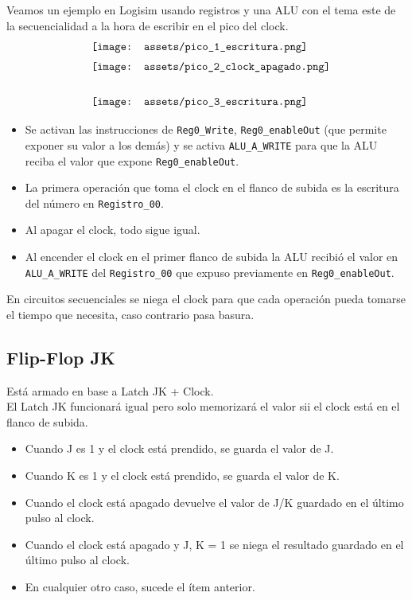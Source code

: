 \documentclass[10pt,a4paper]{article}
\begin{document}
Veamos un ejemplo en Logisim usando registros y una ALU con el tema este de la secuencialidad a la hora de escribir en el pico del clock. \\
\[\begin{minipage}[b]{0.6\textwidth}
    \texttt{[image: assets/pico\_1\_escritura.png]}
    \label{fig:pico_1_escritura}
\end{minipage}\]
\[\begin{minipage}[b]{0.6\textwidth}
    \texttt{[image: assets/pico\_2\_clock\_apagado.png]}
    \label{fig:pico_2_clock_apagado}
\end{minipage}\]
\[\begin{minipage}[b]{0.6\textwidth}
    \texttt{[image: assets/pico\_3\_escritura.png]}
    \label{fig:pico_3_escritura}
\end{minipage}\]
\begin{itemize}
    \item Se activan las instrucciones de \texttt{Reg0\_Write}, \texttt{Reg0\_enableOut} (que permite exponer su valor a los demás) y se activa \texttt{ALU\_A\_WRITE} para que la ALU reciba el valor que expone \texttt{Reg0\_enableOut}.
    \item La primera operación que toma el clock en el flanco de subida es la escritura del número en \texttt{Registro\_00}.
    \item Al apagar el clock, todo sigue igual.
    \item Al encender el clock en el primer flanco de subida la ALU recibió el valor en \texttt{ALU\_A\_WRITE} del \texttt{Registro\_00} que expuso previamente en \texttt{Reg0\_enableOut}.
\end{itemize}
En circuitos secuenciales se niega el clock para que cada operación pueda tomarse el tiempo que necesita, caso contrario pasa basura.

\subsection*{Flip-Flop JK}
Está armado en base a Latch JK + Clock. \\
El Latch JK funcionará igual pero solo memorizará el valor sii el clock está en el flanco de subida.
\begin{itemize}
    \item Cuando J es 1 y el clock está prendido, se guarda el valor de J.
    \item Cuando K es 1 y el clock está prendido, se guarda el valor de K.
    \item Cuando el clock está apagado devuelve el valor de J/K guardado en el último pulso al clock. 
    \item Cuando el clock está apagado y J, K = 1 se niega el resultado guardado en el último pulso al clock.
    \item En cualquier otro caso, sucede el ítem anterior.
\end{itemize}
\end{document}

